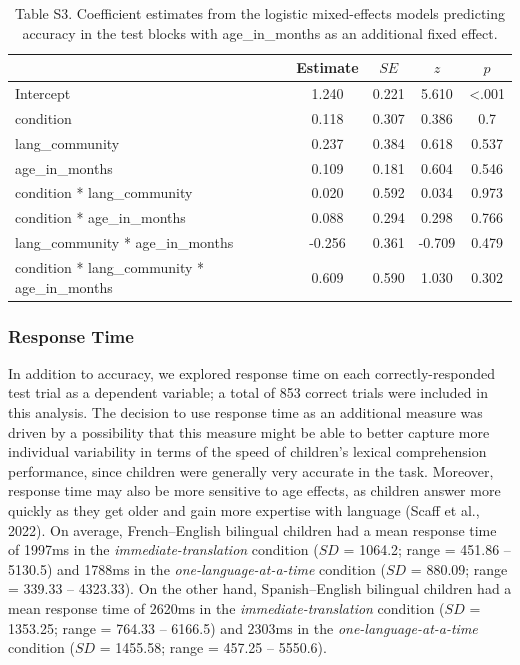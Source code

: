 \documentclass[
  man,floatsintext]{apa7}
\begin{document}
\begin{table}[H]

\begin{center}
\begin{threeparttable}

\caption{\label{tab:unnamed-chunk-11}Table S3. Coefficient estimates from the logistic mixed-effects models predicting accuracy in the test blocks with age\_in\_months as an additional fixed effect.}

\begin{tabular}{lcccc}
\toprule
 & Estimate & $SE$ & $z$ & $p$\\
\midrule
Intercept & 1.240 & 0.221 & 5.610 & <.001\\
condition & 0.118 & 0.307 & 0.386 & 0.7\\
lang\_community & 0.237 & 0.384 & 0.618 & 0.537\\
age\_in\_months & 0.109 & 0.181 & 0.604 & 0.546\\
condition * lang\_community & 0.020 & 0.592 & 0.034 & 0.973\\
condition * age\_in\_months & 0.088 & 0.294 & 0.298 & 0.766\\
lang\_community * age\_in\_months & -0.256 & 0.361 & -0.709 & 0.479\\
condition * lang\_community * age\_in\_months & 0.609 & 0.590 & 1.030 & 0.302\\
\bottomrule
\end{tabular}

\end{threeparttable}
\end{center}

\end{table}

\hypertarget{response-time}{%
\subsubsection{Response Time}\label{response-time}}

In addition to accuracy, we explored response time on each correctly-responded test trial as a dependent variable; a total of 853 correct trials were included in this analysis. The decision to use response time as an additional measure was driven by a possibility that this measure might be able to better capture more individual variability in terms of the speed of children's lexical comprehension performance, since children were generally very accurate in the task. Moreover, response time may also be more sensitive to age effects, as children answer more quickly as they get older and gain more expertise with language (Scaff et al., 2022). On average, French--English bilingual children had a mean response time of 1997ms in the \emph{immediate-translation} condition (\(SD\) = 1064.2; range = 451.86 -- 5130.5) and 1788ms in the \emph{one-language-at-a-time} condition (\(SD\) = 880.09; range = 339.33 -- 4323.33). On the other hand, Spanish--English bilingual children had a mean response time of 2620ms in the \emph{immediate-translation} condition (\(SD\) = 1353.25; range = 764.33 -- 6166.5) and 2303ms in the \emph{one-language-at-a-time} condition (\(SD\) = 1455.58; range = 457.25 -- 5550.6).
\end{document}
